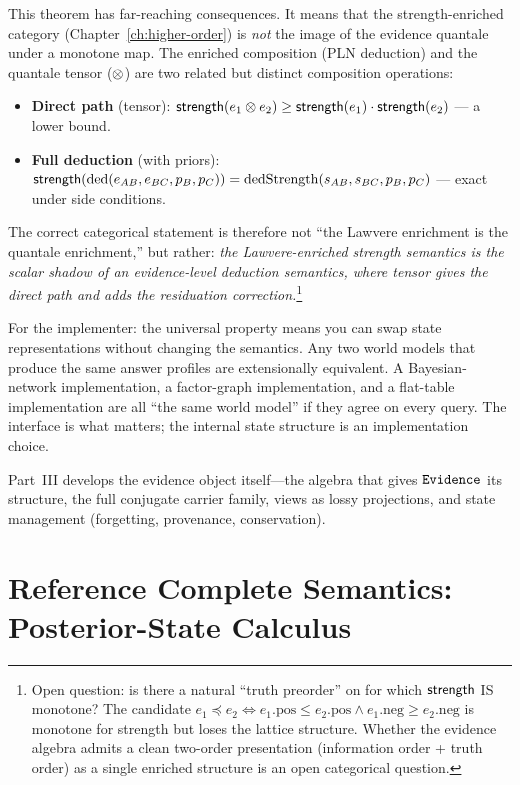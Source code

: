 \documentclass[11pt,openany]{report}
\begin{document}
This theorem has far-reaching consequences.  It means that the
strength-enriched category (Chapter~\ref{ch:higher-order}) is
\emph{not} the image of the evidence quantale under a monotone map.
The enriched composition (PLN deduction) and the quantale tensor
($\otimes$) are two related but distinct composition operations:
\begin{itemize}
\item \textbf{Direct path} (tensor): $\mathsf{strength}(e_1 \otimes e_2)
  \ge \mathsf{strength}(e_1) \cdot \mathsf{strength}(e_2)$ --- a lower bound.
\item \textbf{Full deduction} (with priors): $\mathsf{strength}(\mathrm{ded}(e_{AB},
  e_{BC}, p_B, p_C)) = \mathrm{dedStrength}(s_{AB}, s_{BC}, p_B, p_C)$
  --- exact under side conditions.
\end{itemize}

\noindent
The correct categorical statement is therefore not ``the Lawvere
enrichment is the quantale enrichment,'' but rather: \emph{the
Lawvere-enriched strength semantics is the scalar shadow of an
evidence-level deduction semantics, where tensor gives the direct
path and  adds the residuation
correction.}\footnote{Open question: is there a natural ``truth
preorder'' on \Evidence{} for which $\mathsf{strength}$ IS monotone?  The
candidate $e_1 \preceq e_2 \iff e_1.\mathrm{pos} \le e_2.\mathrm{pos}
\wedge e_1.\mathrm{neg} \ge e_2.\mathrm{neg}$ is monotone for strength
but loses the lattice structure.  Whether the evidence algebra admits
a clean two-order presentation (information order + truth order) as a
single enriched structure is an open categorical question.}

\medskip\noindent
For the implementer: the universal property means you can swap state
representations without changing the semantics.  Any two world models
that produce the same answer profiles are extensionally equivalent.  A
Bayesian-network implementation, a factor-graph implementation, and a
flat-table implementation are all ``the same world model'' if they agree
on every query.  The interface is what matters; the internal state
structure is an implementation choice.

Part~III develops the evidence object itself---the algebra that gives
$\mathtt{Evidence}$ its structure, the full conjugate carrier family, views as
lossy projections, and state management (forgetting, provenance,
conservation).


\chapter{Reference Complete Semantics: Posterior-State Calculus}
\label{ch:posterior-state}
\end{document}
